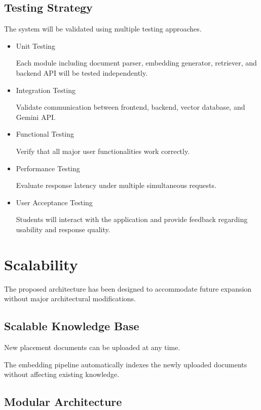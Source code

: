 \documentclass[11pt]{article}
\begin{document}
\subsection{Testing Strategy}

The system will be validated using multiple testing approaches.

\begin{itemize}

\item Unit Testing

Each module including document parser, embedding generator, retriever, and backend API will be tested independently.

\item Integration Testing

Validate communication between frontend, backend, vector database, and Gemini API.

\item Functional Testing

Verify that all major user functionalities work correctly.

\item Performance Testing

Evaluate response latency under multiple simultaneous requests.

\item User Acceptance Testing

Students will interact with the application and provide feedback regarding usability and response quality.

\end{itemize}

\section{Scalability}

The proposed architecture has been designed to accommodate future expansion without major architectural modifications.

\subsection{Scalable Knowledge Base}

New placement documents can be uploaded at any time.

The embedding pipeline automatically indexes the newly uploaded documents without affecting existing knowledge.

\subsection{Modular Architecture}
\end{document}
